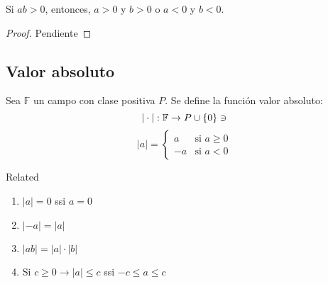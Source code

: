 \begin{theorem}
Si $ab>0$, entonces, $a>0$ y $b>0$ o $a<0$ y $b<0$.
\end{theorem} 

\begin{proof}
Pendiente
\end{proof}

\subsection{Valor absoluto}
\begin{definition}
Sea $\mathbb{F}$ un campo con clase positiva $P$. Se define la función valor absoluto: 
$$|\cdot|: \mathbb{F}\to P \cup \{0\}\ni $$
$$|a|=\begin{cases} 
      a & \text{si } a\geq 0 \\
      -a & \text{si } a<0
   \end{cases}$$
\end{definition}

\begin{theorem}
Related
\begin{enumerate}
    \item $|a|=0$ ssi $a=0$
    \item $|-a|=|a|$
    \item $|ab|=|a|\cdot|b|$
    \item Si $c\geq 0\to |a|\leq c$ ssi $-c\leq a\leq c$
\end{enumerate}
\end{theorem}

